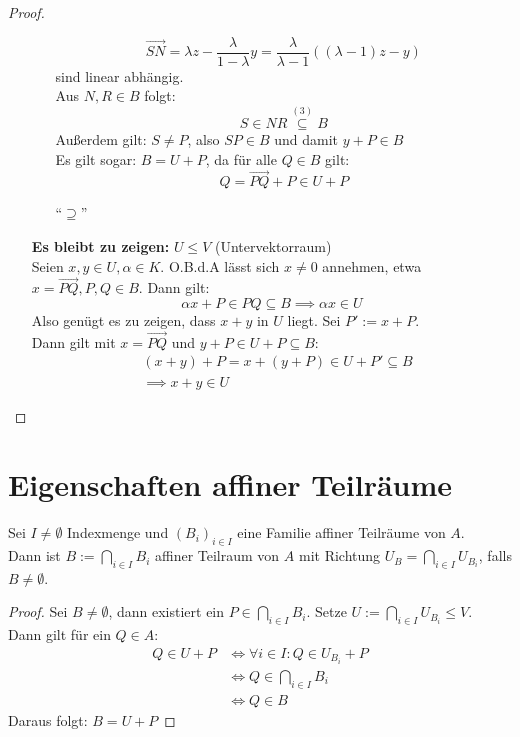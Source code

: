 \documentclass[parskip,a4paper,twoside,DIV15,BCOR12mm]{scrbook}
\begin{document}
\begin{proof}
\begin{itemize}
\begin{enumerate}
\[\overrightarrow{SN} = \lambda z-\frac{\lambda}{1-\lambda}y=\frac{\lambda}{\lambda-1}
((\lambda-1)z-y)\]
sind linear abhängig.\\
Aus $N,R\in B$ folgt:
\[S\in NR \stackrel{(3)}{\subseteq}B\]
Außerdem gilt: $S\ne P$, also $SP\in B$ und damit $y+P\in B$\\
Es gilt sogar: $B=U+P$, da für alle $Q\in B$ gilt:
\[Q=\overrightarrow{PQ}+P\in U+P\]
\item["`$\supseteq$"'] \checkmark
\end{enumerate}
\textbf{Es bleibt zu zeigen:} $U\le V$ (Untervektorraum)\\
Seien $x,y\in U,\alpha\in K$. O.B.d.A lässt sich $x\ne 0$ annehmen, etwa $x=\overrightarrow{PQ},
P,Q\in B$. Dann gilt:\\
\[\alpha x+P\in PQ \subseteq B \implies \alpha x\in U\]
Also genügt es zu zeigen, dass $x+y$ in $U$ liegt. Sei $P':=x+P$.\\
Dann gilt mit $x=\overrightarrow{PQ}$ und $y+P\in U+P\subseteq B$:\\
\begin{align*}
&(x+y)+P=x+(y+P)\in U+P'\subseteq B\\
&\implies x+y\in U
\end{align*}
\end{itemize}
\end{proof}

\section{Eigenschaften affiner Teilräume}
\begin{lemma}
Sei $I\ne\emptyset$ Indexmenge und $(B_i)_{i\in I}$ eine Familie affiner Teilräume von $A$.\\
Dann ist $B:= \bigcap_{i\in I} B_i$ affiner Teilraum von $A$ mit Richtung
$U_B=\bigcap_{i\in I} U_{B_i}$, falls $B\ne\emptyset$.
\end{lemma}

\begin{proof}
Sei $B\ne\emptyset$, dann existiert ein $P\in\bigcap_{i\in I}B_i$.
Setze $U:=\bigcap_{i\in I}U_{B_i} \le V$.\\
Dann gilt für ein $Q\in A$:\\
\begin{align*}
Q\in U+P &\iff \forall i\in I: Q\in U_{B_i}+P\\
&\iff Q\in\bigcap_{i\in I}B_i\\
&\iff Q\in B
\end{align*}
Daraus folgt: $B=U+P$
\end{proof}
\end{document}
